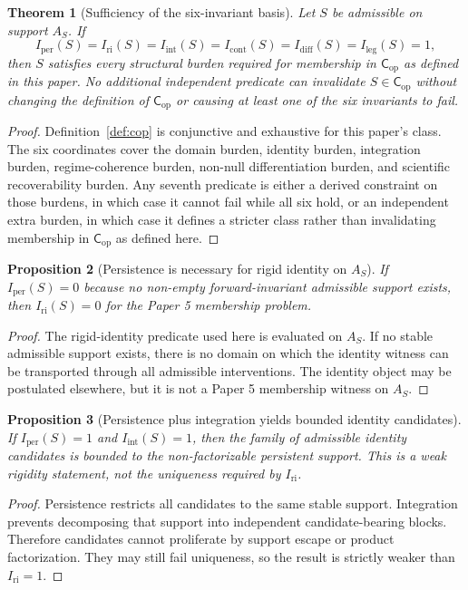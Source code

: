 \documentclass[11pt,a4paper]{article}
\newtheorem{theorem}{Theorem}[section]
\newtheorem{proposition}[theorem]{Proposition}
\theoremstyle{definition}
\newcommand{\Cop}{\mathsf{C}_{\mathrm{op}}}
\newcommand{\Iper}{I_{\mathrm{per}}}
\newcommand{\Iri}{I_{\mathrm{ri}}}
\newcommand{\Iint}{I_{\mathrm{int}}}
\newcommand{\Icont}{I_{\mathrm{cont}}}
\newcommand{\Idiff}{I_{\mathrm{diff}}}
\newcommand{\Ileg}{I_{\mathrm{leg}}}
\newcommand{\Aset}{A_S}
\begin{document}
\begin{theorem}[Sufficiency of the six-invariant basis]\label{thm:six-sufficiency}
Let $S$ be admissible on support $\Aset$. If
\[
\Iper(S)=\Iri(S)=\Iint(S)=\Icont(S)=\Idiff(S)=\Ileg(S)=1,
\]
then $S$ satisfies every structural burden required for membership in $\Cop$ as
defined in this paper. No additional independent predicate can invalidate
$S\in\Cop$ without changing the definition of $\Cop$ or causing at least one of
the six invariants to fail.
\end{theorem}

\begin{proof}
Definition~\ref{def:cop} is conjunctive and exhaustive for this paper's class.
The six coordinates cover the domain burden, identity burden, integration
burden, regime-coherence burden, non-null differentiation burden, and
scientific recoverability burden. Any seventh predicate is either a derived
constraint on those burdens, in which case it cannot fail while all six hold, or
an independent extra burden, in which case it defines a stricter class rather
than invalidating membership in $\Cop$ as defined here.
\end{proof}

\begin{proposition}[Persistence is necessary for rigid identity on $\Aset$]\label{prop:not-per-not-ri}
If $\Iper(S)=0$ because no non-empty forward-invariant admissible support exists,
then $\Iri(S)=0$ for the Paper 5 membership problem.
\end{proposition}

\begin{proof}
The rigid-identity predicate used here is evaluated on $\Aset$. If no stable
admissible support exists, there is no domain on which the identity witness can
be transported through all admissible interventions. The identity object may be
postulated elsewhere, but it is not a Paper 5 membership witness on $\Aset$.
\end{proof}

\begin{proposition}[Persistence plus integration yields bounded identity candidates]\label{prop:per-int-weak-ri}
If $\Iper(S)=1$ and $\Iint(S)=1$, then the family of admissible identity
candidates is bounded to the non-factorizable persistent support. This is a weak
rigidity statement, not the uniqueness required by $\Iri$.
\end{proposition}

\begin{proof}
Persistence restricts all candidates to the same stable support. Integration
prevents decomposing that support into independent candidate-bearing blocks.
Therefore candidates cannot proliferate by support escape or product
factorization. They may still fail uniqueness, so the result is strictly weaker
than $\Iri=1$.
\end{proof}
\end{document}
